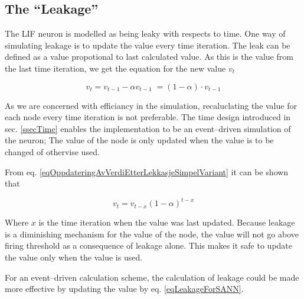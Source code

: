 	\subsection{The ``Leakage''}
	\label{secTheLeakageForSANN}

	The LIF neuron is modelled as being leaky with respects to time. %
	One way of simulating leakage is to update the value every time iteration. %
	The leak can be defined as a value propotional to last calculated value.
	As this is the value from the last time iteration, we get the equation for the new value $v_t$
	
	\begin{equation}
		v_t = v_{t-1} - \alpha v_{t-1} \; = (1-\alpha) \cdot v_{t-1}
		\label{eqOppdateringAvVerdiEtterLekkasjeSimpelVariant}
	\end{equation}

	As we are concerned with efficiancy in the simulation, recaluclating the value for each node every time iteration is not preferable.
%
	The time design introduced in sec. \ref{ssecTime} enables the implementation to be an event--driven simulation of the neuron;
		The value of the node is only updated when the value is to be changed of othervise used.

	From eq. \eqref{eqOppdateringAvVerdiEtterLekkasjeSimpelVariant} it can be shown that 

	\begin{equation}
		v_t = v_{t-x} (1-\alpha)^{t-x}
		\label{eqLeakageForSANN}
	\end{equation}
	
	Where $x$ is the time iteration when the value was last updated.
	Because leakage is a diminishing mechanism for the value of the node, the value will not go above firing threshold as a consequence of leakage alone.
	This makes it safe to update the value only when the value is used.


	For an event--driven calculation scheme, the calculation of leakage could be made more effective by updating the value by eq. \eqref{eqLeakageForSANN}. %
%	

